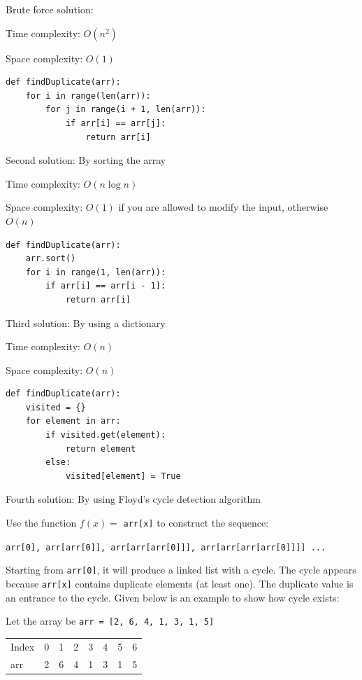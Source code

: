 \documentclass[a4paper,11pt]{book}
\begin{document}
\noindent Brute force solution:

\noindent Time complexity: $O(n^2)$

\noindent Space complexity: $O(1)$

\begin{lstlisting}
def findDuplicate(arr):
    for i in range(len(arr)):
        for j in range(i + 1, len(arr)):
            if arr[i] == arr[j]:
                return arr[i]
\end{lstlisting}

\noindent Second solution: By sorting the array

\noindent Time complexity: $O(n\log n)$

\noindent Space complexity: $O(1)$ if you are allowed to modify the input, otherwise $O(n)$

\begin{lstlisting}
def findDuplicate(arr):
    arr.sort()
    for i in range(1, len(arr)):
        if arr[i] == arr[i - 1]:
            return arr[i]
\end{lstlisting}

\noindent Third solution: By using a dictionary

\noindent Time complexity: $O(n)$

\noindent Space complexity: $O(n)$

\begin{lstlisting}
def findDuplicate(arr):
    visited = {}
    for element in arr:
        if visited.get(element):
            return element
        else:
            visited[element] = True
\end{lstlisting}

\noindent Fourth solution: By using Floyd's cycle detection algorithm

\noindent Use the function $f(x) = $ \lstinline{arr[x]} to construct the sequence:
\vspace{3mm}

\lstinline{arr[0], arr[arr[0]], arr[arr[arr[0]]], arr[arr[arr[arr[0]]]] ... }
\vspace{3mm}

\noindent Starting from \lstinline{arr[0]}, it will produce a linked list with a cycle. The cycle appears because \lstinline{arr[x]} contains duplicate elements (at least one). The duplicate value is an entrance to the cycle. Given below is an example to show how cycle exists: 

\noindent Let the array be \lstinline{arr = [2, 6, 4, 1, 3, 1, 5]}

\begin{table}[H]
\begin{tabular}{llllllll}
Index & 0 & 1 & 2 & 3 & 4 & 5 & 6 \\
arr   & 2 & 6 & 4 & 1 & 3 & 1 & 5
\end{tabular}
\end{table}
\end{document}
